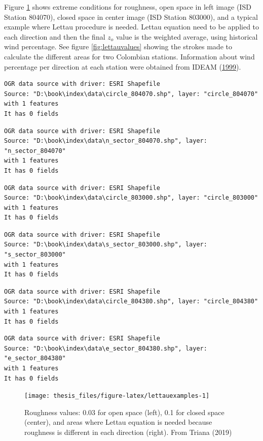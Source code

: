 \documentclass[12pt,oneside]{reedthesis}
\begin{document}
Figure \ref{fig:lettauexamples} shows extreme conditions for roughness, open space in left image (ISD Station 804070), closed space in center image (ISD Station 803000), and a typical example where Lettau procedure is needed. Lettau equation need to be applied to each direction and then the final \(z_o\) value is the weighted average, using historical wind percentage. See figure \ref{fig:lettauvalues} showing the strokes made to calculate the different areas for two Colombian stations. Information about wind percentage per direction at each station were obtained from IDEAM (\protect\hyperlink{ref-ideam1999}{1999}).

\footnotesize
\begin{verbatim}
OGR data source with driver: ESRI Shapefile 
Source: "D:\book\index\data\circle_804070.shp", layer: "circle_804070"
with 1 features
It has 0 fields
\end{verbatim}
\begin{verbatim}
OGR data source with driver: ESRI Shapefile 
Source: "D:\book\index\data\n_sector_804070.shp", layer: "n_sector_804070"
with 1 features
It has 0 fields
\end{verbatim}
\begin{verbatim}
OGR data source with driver: ESRI Shapefile 
Source: "D:\book\index\data\circle_803000.shp", layer: "circle_803000"
with 1 features
It has 0 fields
\end{verbatim}
\begin{verbatim}
OGR data source with driver: ESRI Shapefile 
Source: "D:\book\index\data\s_sector_803000.shp", layer: "s_sector_803000"
with 1 features
It has 0 fields
\end{verbatim}
\begin{verbatim}
OGR data source with driver: ESRI Shapefile 
Source: "D:\book\index\data\circle_804380.shp", layer: "circle_804380"
with 1 features
It has 0 fields
\end{verbatim}
\begin{verbatim}
OGR data source with driver: ESRI Shapefile 
Source: "D:\book\index\data\e_sector_804380.shp", layer: "e_sector_804380"
with 1 features
It has 0 fields
\end{verbatim}
\begin{figure}

{\centering \texttt{[image: thesis\_files/figure-latex/lettauexamples-1]} 

}

\caption{Roughness values: 0.03 for open space (left), 0.1 for closed space (center), and areas where Lettau equation is needed because roughness is different in each direction (right). From Triana (2019)}\label{fig:lettauexamples}
\end{figure}
\normalsize
\end{document}
